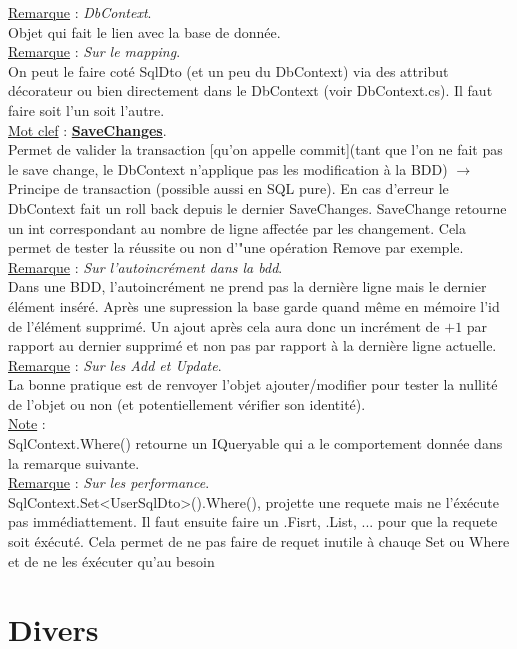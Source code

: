 \documentclass[a4paper,12pt,twoside]{article}
\newcommand{\urlcolor}{magenta}  %
\newcommand{\keycolor}{purple} %
\newcommand{\incode}[1]{{\footnotesize\ttfamily #1}} %
\newcommand{\rem}[2]{\noindent\underline{Remarque} : \textit{#1}.\\ \indent #2}
\newcommand{\note}[1]{\noindent\underline{Note} : \\ \indent #1}
\newcommand{\keyref}[2]{\hypersetup{urlcolor=\keycolor} \href{#1}{\textbf{#2}}\hypersetup{urlcolor=\urlcolor}}
\newcommand{\keyword}[3]{\noindent\underline{Mot clef} : \keyref{#1}{#2}. \\ \indent #3}
\begin{document}
\rem{DbContext}{Objet qui fait le lien avec la base de donnée.}\\

\rem{Sur le mapping}{On peut le faire coté SqlDto (et un peu du DbContext) via des attribut décorateur ou bien directement dans le DbContext (voir DbContext.cs). Il faut faire soit l'un soit l'autre.}\\

\keyword{https://docs.microsoft.com/fr-fr/dotnet/api/system.data.entity.dbcontext.savechanges?view=entity-framework-6.2.0}{SaveChanges}{Permet de valider la transaction [qu'on appelle commit](tant que l'on ne fait pas le save change, le DbContext n'applique pas les modification à la BDD) $\to$ Principe de transaction (possible aussi en SQL pure). En cas d'erreur le DbContext fait un roll back depuis le dernier \incode{SaveChanges}. \incode{SaveChange} retourne un int correspondant au nombre de ligne affectée par les changement. Cela permet de tester la réussite ou non d'"une opération \incode{Remove} par exemple.}\\

\rem{Sur l'autoincrément dans la bdd}{Dans une BDD, l'autoincrément ne prend pas la dernière ligne mais le dernier élément inséré. Après une supression la base garde quand même en mémoire l'id de l'élément supprimé. Un ajout après cela aura donc un incrément de $+1$ par rapport au dernier supprimé et non pas par rapport à la dernière ligne actuelle.}\\

\rem{Sur les Add et Update}{La bonne pratique est de renvoyer l'objet ajouter/modifier pour tester la nullité de l'objet ou non (et potentiellement vérifier son identité).}\\

\note{SqlContext.Where() retourne un IQueryable qui a le comportement donnée dans la remarque suivante.}\\

\rem{Sur les performance}{SqlContext.Set<UserSqlDto>().Where(), projette une requete mais ne l'éxécute pas immédiattement. Il faut ensuite faire un .Fisrt, .List, ... pour que la requete soit éxécuté. Cela permet de ne pas faire de requet inutile à chauqe Set ou Where et de ne les éxécuter qu'au besoin}\\

\section{Divers}
\end{document}

